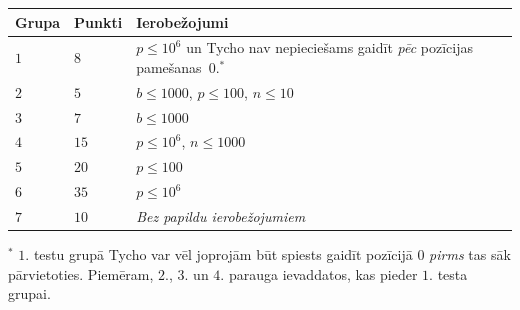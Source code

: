 \medskip
\begin{tabular}{lll}
  Grupa & Punkti & Ierobežojumi\\\hline
  $1$ & $8$  & $p\leq 10^6$ un Tycho nav nepieciešams gaidīt \emph{pēc} pozīcijas pamešanas~$0$.$^*$ \\ %
  $2$ & $5$  & $b\leq 1000$, $p\leq 100$, $n\leq 10$ \\
  $3$ & $7$  & $b\leq 1000$ \\
  $4$ & $15$ & $p\leq 10^6$, $n\leq 1000$\\
  $5$ & $20$ & $p\leq 100$\\
  $6$ & $35$ & $p\leq 10^6$\\
  $7$ & $10$ & \emph{Bez papildu ierobežojumiem}
\end{tabular}

\medskip
\noindent $^*$ $1.$ testu grupā Tycho var vēl joprojām būt spiests gaidīt pozīcijā $0$ \emph{pirms} tas sāk pārvietoties. Piemēram, $2.$, $3.$ un $4.$ parauga ievaddatos, kas pieder $1.$ testa grupai.
